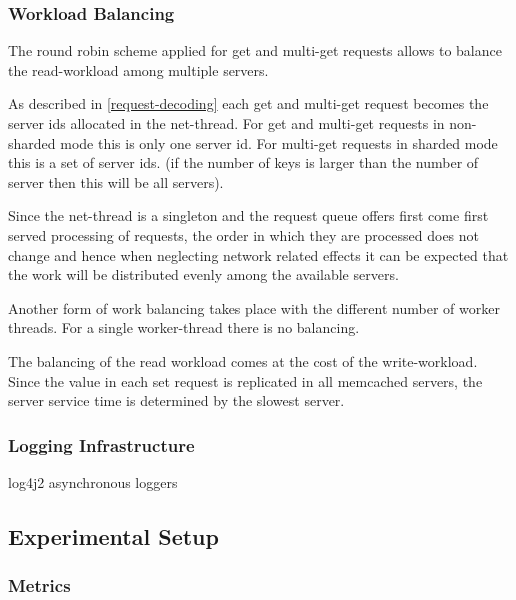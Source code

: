 \documentclass[report.tex]{subfiles}
\begin{document}
\subsubsection{Workload Balancing}\label{workload-balancing}
The round robin scheme applied for get and multi-get requests allows to balance the read-workload among multiple servers.

As described in \ref{request-decoding} each get and multi-get request becomes the server ids allocated in the net-thread.
For get and multi-get requests in non-sharded mode this is only one server id. For multi-get requests in sharded mode this is a set of server ids. (if the number of keys is larger than the number of server then this will be all servers).

Since the net-thread is a singleton and the request queue offers first come first served processing of requests, the order in which they are processed does not change and hence when neglecting network related effects it can be expected that the work will be distributed evenly among the available servers.

Another form of work balancing takes place with the different number of worker threads. For a single worker-thread there is no balancing. 

The balancing of the read workload comes at the cost of the write-workload. Since the value in each set request is replicated in all memcached servers, the server service time is determined by the slowest server. 


\subsubsection{Logging Infrastructure}

log4j2 asynchronous loggers


\subsection{Experimental Setup}

\subsubsection{Metrics}\label{measured-points}
\end{document}
